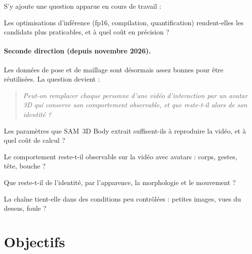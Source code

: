 \documentclass[11pt,a4paper]{report}
\begin{document}
S'y ajoute une question apparue en cours de travail :
\begin{description}[leftmargin=1.2cm]
    \item[Q5] Les optimisations d'inférence (fp16, compilation, quantification) rendent-elles les candidats plus
    praticables, et à quel coût en précision ?
\end{description}


\paragraph{Seconde direction (depuis novembre 2026).} Les données de pose et de maillage sont désormais assez bonnes pour être
réutilisées. La question devient :

\begin{quote}
\emph{Peut-on remplacer chaque personne d'une vidéo d'interaction par un avatar 3D qui conserve son comportement observable, et que
reste-t-il alors de son identité ?}
\end{quote}

\begin{description}[leftmargin=1.2cm]
    \item[Q6] Les paramètres que SAM~3D Body extrait suffisent-ils à reproduire la vidéo, et à quel coût de calcul ?
    \item[Q7] Le comportement reste-t-il observable sur la vidéo avec avatars : corps, gestes, tête, bouche ?
    \item[Q8] Que reste-t-il de l'identité, par l'apparence, la morphologie et le mouvement ?
    \item[Q9] La chaîne tient-elle dans des conditions peu contrôlées : petites images, vues du dessus, foule ?
\end{description}

\section{Objectifs}
\end{document}
